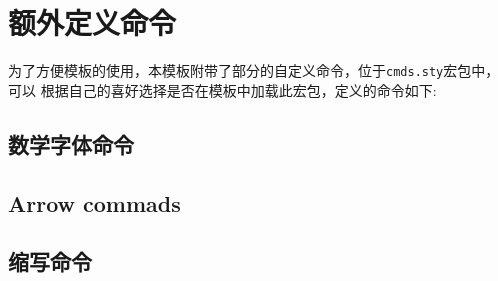 \section{额外定义命令}
为了方便模板的使用，本模板附带了部分的自定义命令，位于\verb|cmds.sty|宏包中，可以
根据自己的喜好选择是否在模板中加载此宏包，定义的命令如下:

\subsection{数学字体命令}
\begin{bytes}
\newcommand{\dd}{\mathrm{d}}
\newcommand{\C}[1]{\ensuremath{\mathcal{#1}}}
\renewcommand{\S}[1]{\ensuremath{\mathscr{#1}}}
\newcommand{\B}[1]{\ensuremath{\mathbb{#1}}}
\newcommand{\F}[1]{\ensuremath{\bm{#1}}}
\newcommand{\R}[1]{\ensuremath{\mathrm{#1}}}
\end{bytes}

\subsection{Arrow commads}
\begin{bytes}
\newcommand{\lr}{\ensuremath{\longrightarrow}}
\newcommand{\equ}{\ensuremath{\Longleftrightarrow}\,}
\newcommand{\sr}{\ensuremath{\longmapsto}}
\newcommand{\lrr}[2][]{\ensuremath{\xRightarrow[#1]{#2}}}
\newcommand{\ns}{\ensuremath{\varnothing}}
\newcommand{\A}{\ensuremath{\forall}}
\end{bytes}


\subsection{缩写命令}
\begin{bytes}
\newcommand{\im}[1]{\ensuremath{\displaystyle #1}}
\newcommand{\dis}{\displaystyle}
\newcommand{\scale}[2]{\scalebox{#1}[#1]{#2}}
\newcommand{\sep}[1]{\hspace{#1}}
\newcommand{\lis}{\ensuremath{\text{\ding{227}\sep{.5em}}}}
\end{bytes}

